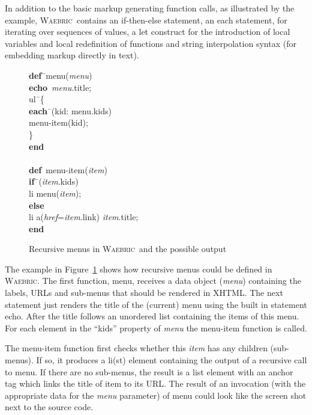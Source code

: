 \documentclass[a4paper]{article}
\def\Waebric{\textsc{Waebric}\xspace}
\def\Def{\textbf{def}}
\def\End{\textbf{end}}
\def\If{\textbf{if}}
\def\Each{\textbf{each}}
\def\Else{\textbf{else}}
\def\Echo{\textbf{echo}}
\def\Var#1{\textit{#1}}
\begin{document}
In addition to the basic markup generating function calls, as
illustrated by the example, \Waebric\ contains an if-then-else
statement, an each statement, for iterating over sequences of values,
a let construct for the introduction of local variables and local
redefinition of functions and string interpolation syntax (for
embedding markup directly in text).

\begin{figure}
\begin{minipage}{0.6\linewidth}
\begin{tabbing}
\Def\=\ menu(\Var{menu})\\
\>\Echo\ \Var{menu}.title;\\
\>ul\=\ \{\\
\>\>\Each\=\ (kid: menu.kids)\\
\>\>\>menu-item(kid); \\
\>\}\\
\End\\
\\
\Def\ menu-item(\Var{item})\\
\>\If\=\ (\Var{item}.kids) \\
\>\>li menu(\Var{item});\\
\>\Else\\
\>\>li a(\Var{href}=\Var{item}.link) \Var{item}.title;\\
\End
\end{tabbing}
\end{minipage}
\begin{minipage}[b]{0.4\linewidth}
\begin{center}
\end{center}
\end{minipage}
\caption{Recursive menus in \Waebric\ and the possible
  output\label{FIG:menus}}
\end{figure}

The example in Figure~\ref{FIG:menus} shows how recursive menus could
be defined in \Waebric. The first function, menu, receives a data
object (\Var{menu}) containing the labels, URLs and sub-menus that
should be rendered in XHTML. The next statement just renders the title
of the (current) menu using the built in statement echo. After
the title follows an unordered list containing the items of this
menu. For each element in the ``kids'' property of \Var{menu} the
menu-item function is called.

The menu-item function first checks whether this \Var{item} has any
children (sub-menus). If so, it produces a li(st) element containing
the output of a recursive call to menu. If there are no sub-menus,
the result is a list element with an anchor tag which links the title
of item to its URL. The result of an invocation (with the appropriate
data for the \textit{menu} parameter) of menu could look like the
screen shot next to the source code.
\end{document}
